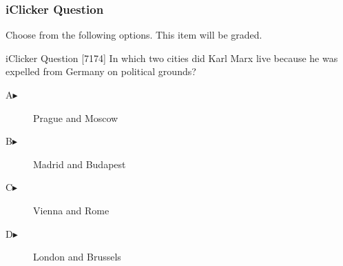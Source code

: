 \begin{frame}
  \frametitle{iClicker Question}
Choose from the following options. This item will be graded.
\begin{block}{iClicker Question}
[7174] In which two cities did Karl Marx live because he was expelled from Germany on political grounds?
\end{block}
\begin{description}
\item[A\hspace{.2in}$\blacktriangleright$] Prague and Moscow
\item[B\hspace{.2in}$\blacktriangleright$] Madrid and Budapest
\item[C\hspace{.2in}$\blacktriangleright$] Vienna and Rome
\item[D\hspace{.2in}$\blacktriangleright$] London and Brussels
\end{description}
\end{frame}